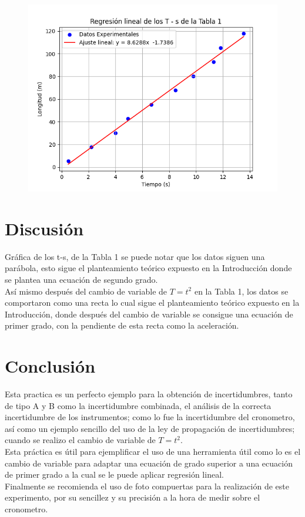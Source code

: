 \documentclass[12pt,a4paper]{article}
\begin{document}
\begin{figure}[h!]
\centering
\includegraphics[scale=0.68]{2T-s.png}
\end{figure}

\newpage

\section{Discusión}

Gráfica de los t-s, de la Tabla 1 se puede notar que los datos siguen una parábola, esto sigue el planteamiento teórico expuesto en la Introducción donde se plantea una ecuación de segundo grado. \\
Así mismo después del cambio de variable de $T = t^2$ en la Tabla 1, los datos se comportaron como una recta lo cual sigue el planteamiento teórico expuesto en la Introducción, donde después del cambio de variable se consigue una ecuación de primer grado, con la pendiente de esta recta como la aceleración.\\

\section{Conclusión}

Esta practica es un perfecto ejemplo para la obtención de incertidumbres, tanto de tipo A y B como la incertidumbre combinada, el análisis de la correcta incertidumbre de los instrumentos; como lo fue la incertidumbre del cronometro, así como un ejemplo sencillo del uso de la ley de propagación de incertidumbres; cuando se realizo el cambio de variable de $T = t^2$.\\
Esta práctica es útil para ejemplificar el uso de una herramienta útil como lo es el cambio de variable para adaptar una ecuación de grado superior a una ecuación de primer grado a la cual se le puede aplicar regresión lineal. \\
Finalmente se recomienda el uso de foto compuertas para la realización de este experimento, por su sencillez y su precisión a la hora de medir sobre el cronometro.
\end{document}

